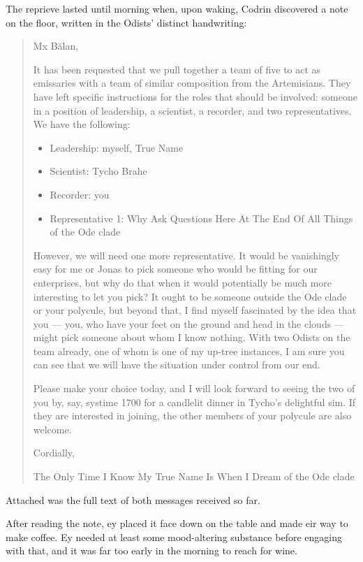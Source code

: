 The reprieve lasted until morning when, upon waking, Codrin discovered a note on the floor, written in the Odists' distinct handwriting:

\begin{quote}
Mx Bălan,

It has been requested that we pull together a team of five to act as emissaries with a team of similar composition from the Artemisians. They have left specific instructions for the roles that should be involved: someone in a position of leadership, a scientist, a recorder, and two representatives. We have the following:

\begin{itemize}
\tightlist
\item
  Leadership: myself, True Name
\item
  Scientist: Tycho Brahe
\item
  Recorder: you
\item
  Representative 1: Why Ask Questions Here At The End Of All Things of the Ode clade
\end{itemize}

However, we will need one more representative. It would be vanishingly easy for me or Jonas to pick someone who would be fitting for our enterprises, but why do that when it would potentially be much more interesting to let you pick? It ought to be someone outside the Ode clade or your polycule, but beyond that, I find myself fascinated by the idea that you — you, who have your feet on the ground and head in the clouds — might pick someone about whom I know nothing. With two Odists on the team already, one of whom is one of my up-tree instances, I am sure you can see that we will have the situation under control from our end.

Please make your choice today, and I will look forward to seeing the two of you by, say, systime 1700 for a candlelit dinner in Tycho's delightful sim. If they are interested in joining, the other members of your polycule are also welcome.

Cordially,

The Only Time I Know My True Name Is When I Dream of the Ode clade
\end{quote}

Attached was the full text of both messages received so far.

After reading the note, ey placed it face down on the table and made eir way to make coffee. Ey needed at least some mood-altering substance before engaging with that, and it was far too early in the morning to reach for wine.

